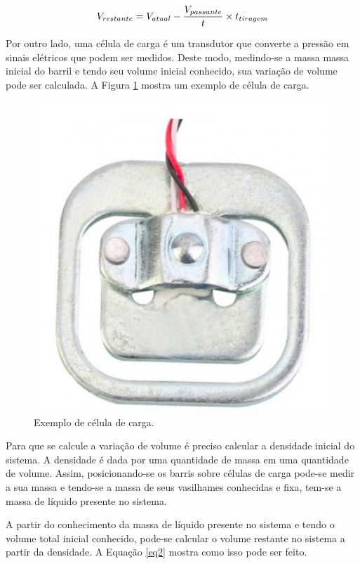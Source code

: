				\begin{equation} 
					\label{eq1}
					V_{restante} = V_{atual} -  {V_{passante}\over t}\times{t_{tiragem}}
				\end{equation}

				Por outro lado, uma célula de carga é um transdutor que  converte a pressão em sinais elétricos que podem ser medidos. Deste modo, medindo-se a massa massa inicial do barril e tendo seu volume inicial  conhecido, sua variação de volume pode ser calculada. A Figura \ref{celula-carga}  mostra um exemplo de célula de carga. 

				\begin{figure}[H]
					\centering
					\includegraphics[scale= 0.7]{figuras/celula-carga.png}
					\caption{Exemplo de célula de carga.}
					\label{celula-carga}
				\end{figure}	

				Para que se calcule a variação de volume é preciso calcular a densidade inicial do sistema. A densidade é dada por uma quantidade de massa em uma quantidade de volume. Assim, posicionando-se os barris sobre células de carga pode-se medir a sua massa e tendo-se a massa de seus vasilhames conhecidas e fixa, tem-se a massa de líquido presente no sistema. 

				A partir do conhecimento da massa de líquido presente no sistema e tendo o volume total inicial conhecido, pode-se calcular o volume restante no sistema a partir da densidade. A Equação \ref{eq2} mostra como isso pode ser feito.
				 
